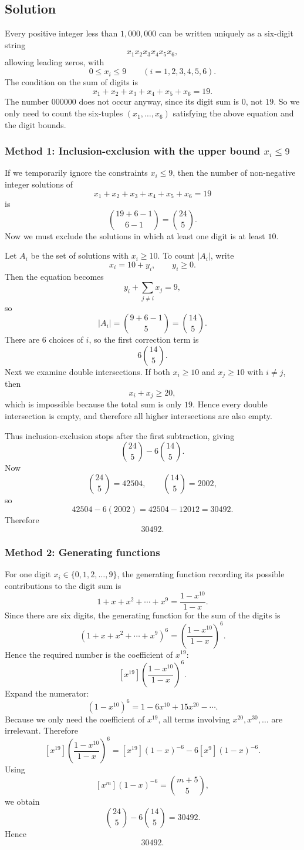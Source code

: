 \documentclass[12pt]{article}
\begin{document}
\subsection{Solution}
Every positive integer less than $1{,}000{,}000$ can be written uniquely as a six-digit string
\[
x_1x_2x_3x_4x_5x_6,
\]
allowing leading zeros, with
\[
0\le x_i\le 9 \qquad (i=1,2,3,4,5,6).
\]
The condition on the sum of digits is
\[
x_1+x_2+x_3+x_4+x_5+x_6=19.
\]
The number $000000$ does not occur anyway, since its digit sum is $0$, not $19$. So we only need to count the six-tuples $(x_1,\dots,x_6)$ satisfying the above equation and the digit bounds.

\subsubsection{Method 1: Inclusion-exclusion with the upper bound $x_i\le 9$}
If we temporarily ignore the constraints $x_i\le 9$, then the number of non-negative integer solutions of
\[
x_1+x_2+x_3+x_4+x_5+x_6=19
\]
is
\[
\binom{19+6-1}{6-1}=\binom{24}{5}.
\]
Now we must exclude the solutions in which at least one digit is at least $10$.

Let $A_i$ be the set of solutions with $x_i\ge 10$. To count $|A_i|$, write
\[
x_i=10+y_i, \qquad y_i\ge 0.
\]
Then the equation becomes
\[
y_i+\sum_{j\ne i}x_j=9,
\]
so
\[
|A_i|=\binom{9+6-1}{5}=\binom{14}{5}.
\]
There are $6$ choices of $i$, so the first correction term is
\[
6\binom{14}{5}.
\]
Next we examine double intersections. If both $x_i\ge 10$ and $x_j\ge 10$ with $i\ne j$, then
\[
x_i+x_j\ge 20,
\]
which is impossible because the total sum is only $19$. Hence every double intersection is empty, and therefore all higher intersections are also empty.

Thus inclusion-exclusion stops after the first subtraction, giving
\[
\binom{24}{5}-6\binom{14}{5}.
\]
Now
\[
\binom{24}{5}=42504,
\qquad
\binom{14}{5}=2002,
\]
so
\[
42504-6(2002)=42504-12012=30492.
\]
Therefore
\[
\boxed{30492}.
\]

\subsubsection{Method 2: Generating functions}
For one digit $x_i\in\{0,1,2,\dots,9\}$, the generating function recording its possible contributions to the digit sum is
\[
1+x+x^2+\cdots +x^9=\frac{1-x^{10}}{1-x}.
\]
Since there are six digits, the generating function for the sum of the digits is
\[
\left(1+x+x^2+\cdots +x^9\right)^6
=\left(\frac{1-x^{10}}{1-x}\right)^6.
\]
Hence the required number is the coefficient of $x^{19}$:
\[
[x^{19}]\left(\frac{1-x^{10}}{1-x}\right)^6.
\]
Expand the numerator:
\[
(1-x^{10})^6=1-6x^{10}+15x^{20}-\cdots.
\]
Because we only need the coefficient of $x^{19}$, all terms involving $x^{20},x^{30},\dots$ are irrelevant. Therefore
\[
[x^{19}]\left(\frac{1-x^{10}}{1-x}\right)^6
=[x^{19}](1-x)^{-6}-6[x^9](1-x)^{-6}.
\]
Using
\[
[x^m](1-x)^{-6}=\binom{m+5}{5},
\]
we obtain
\[
\binom{24}{5}-6\binom{14}{5}=30492.
\]
Hence
\[
\boxed{30492}.
\]
\end{document}
